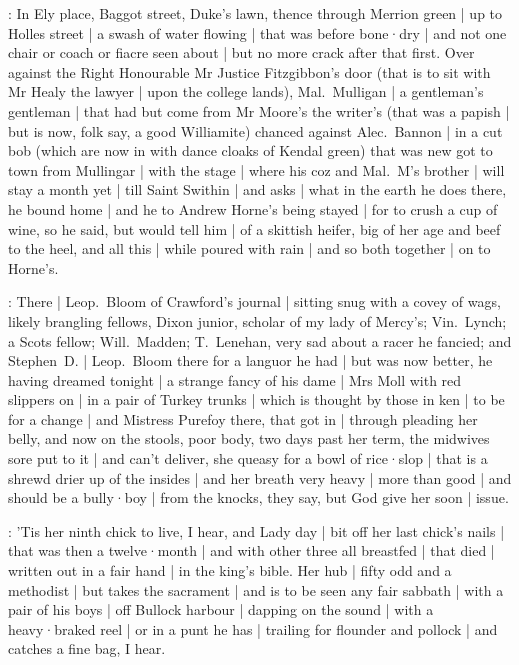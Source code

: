:
In Ely place,
Baggot street,
Duke's lawn,
thence through Merrion green |
up to Holles street |
a swash of water flowing |
that was before bone·dry |
and not one chair or coach or fiacre seen about |
but no more crack after that first.
Over against the Right Honourable Mr Justice Fitzgibbon's door
(that is to sit with Mr Healy the lawyer |
upon the college lands),
Mal.~Mulligan |
a gentleman's gentleman |
that had but come from Mr Moore's the writer's
(that was a papish |
but is now,
folk say,
a good Williamite)
chanced against Alec.~Bannon |
in a cut bob
(which are now in with dance cloaks of Kendal green)
that was new got to town from Mullingar |
with the stage |
where his coz and Mal.~M's brother |
will stay a month yet |
till Saint Swithin |
and asks |
what in the earth he does there,
he bound home |
and he to Andrew Horne's being stayed |
for to crush a cup of wine,
so he said,
but would tell him |
of a skittish heifer,
big of her age and beef to the heel,
and all this |
while poured with rain |
and so both together |
on to Horne's.

:
There |
Leop.~Bloom of Crawford's journal |
sitting snug with a covey of wags,
likely brangling fellows,
Dixon junior,
scholar of my lady of Mercy's;
Vin.~Lynch;
a Scots fellow;
Will.~Madden;
T.~Lenehan,
very sad about a racer he fancied;
and Stephen~D. |
Leop.~Bloom there for a languor he had |
but was now better,
he having dreamed tonight |
a strange fancy of his dame |
Mrs Moll with red slippers on |
in a pair of Turkey trunks |
which is thought by those in ken |
to be for a change |
and Mistress Purefoy there,
that got in |
through pleading her belly,
and now on the stools,
poor body,
two days past her term,
the midwives sore put to it |
and can't deliver,
she queasy for a bowl of rice·slop |
that is a shrewd drier up of the insides |
and her breath very heavy |
more than good |
and should be a bully·boy |
from the knocks,
they say,
but God give her soon |
issue.

:
'Tis her ninth chick to live,
I hear,
and Lady day |
bit off her last chick's nails |
that was then a twelve·month |
and with other three all breastfed |
that died |
written out in a fair hand |
in the king's bible.
Her hub |
fifty odd and a methodist |
but takes the sacrament |
and is to be seen any fair sabbath |
with a pair of his boys |
off Bullock harbour |
dapping on the sound |
with a heavy·braked reel |
or in a punt he has |
trailing for flounder and pollock |
and catches a fine bag,
I hear.

